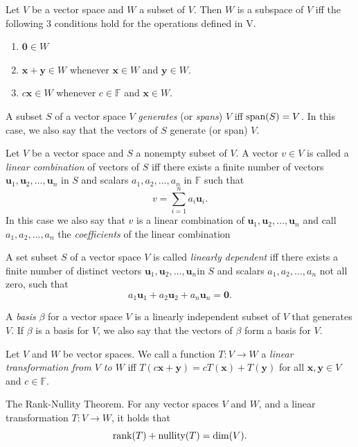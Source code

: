 \documentclass[../Notes.tex]{subfiles}
\begin{document}
\begin{theorem}{}{}
    Let \(V\) be a vector space and \(W\) a subset of \(V\). Then \(W\) is a subspace of \(V\) iff the following 3 conditions hold for the operations defined in V.
            \begin{enumerate}[label=(\alph*)]
                \item \(\mathbf{0} \in W\) \label{Theorem 1.3(a)}
                \item \(\mathbf{x}+\mathbf{y} \in W\) whenever \(\mathbf{x} \in W\) and \(\mathbf{y} \in W\). \label{Theorem 1.3(b)}
                \item \(c\mathbf{x} \in W\) whenever \(c \in \mathbb{F}\) and \(\mathbf{x} \in W\). \label{Theorem 1.3(c)}
            \end{enumerate}
\end{theorem}
\begin{definition}{}{}
    A subset \(S\) of a vector space \(V\) \emph{generates} (or \emph{spans}) \(V\) iff \(\operatorname{span}(S)=V\). In this case, we also say that the vectors of \(S\) generate (or span) \(V\).
\end{definition}
\begin{definition}{}{}
    Let \(V\) be a vector space and \(S\) a nonempty subset of \(V\). A vector \(v \in V\) is called a \emph{linear combination} of vectors of \(S\) iff there exists a finite number of vectors \(\mathbf{u}_1,\mathbf{u}_2,\dots,\mathbf{u}_n\) in \(S\) and scalars \(a_1,a_2,\dots,a_n\) in \(\mathbb{F}\) such that
            \[v=\sum_{i=1}^{n}{a_i\mathbf{u}_i}.\]
            In this case we also say that \(v\) is a linear combination of \(\mathbf{u}_1,\mathbf{u}_2,\dots,\mathbf{u}_n\) and call \(a_1,a_2,\dots,a_n\) the \emph{coefficients} of the linear combination
\end{definition}
\begin{definition}{}{}
    A set subset \(S\) of a vector space \(V\) is called \emph{linearly dependent} iff there exists a finite number of distinct vectors \(\mathbf{u}_1,\mathbf{u}_2,\dots,\mathbf{u}_n\)in \(S\) and scalars \(a_1,a_2,\dots,a_n\) not all zero, such that
            \[a_1\mathbf{u}_1+a_2\mathbf{u}_2+a_n\mathbf{u}_n=\mathbf{0}.\]
\end{definition}
\begin{definition}{}{}
    A \emph{basis} \(\beta\) for a vector space \(V\) is a linearly independent subset of \(V\) that generates \(V\). If \(\beta\) is a basis for \(V\), we also say that the vectors of \(\beta\) form a basis for \(V\).
\end{definition}
\begin{definition}{}{}
    Let \(V\) and \(W\) be vector spaces. We call a function \(T\colon V\to W\) a \emph{linear transformation from \(V\) to \(W\)} iff \(T(c\mathbf{x}+\mathbf{y})=cT(\mathbf{x})+T(\mathbf{y})\) for all \(\mathbf{x},\mathbf{y}\in V\) and \(c\in \mathbb{F}\).
\end{definition}
\begin{theorem}{The Rank-Nullity Theorem.}{}
    For any vector spaces \(V\) and \(W\), and a linear transformation \(T \colon V \to W\), it holds that
    \[\operatorname{rank}(T)+\operatorname{nullity}(T)=\dim(V).\]
\end{theorem}
\end{document}
